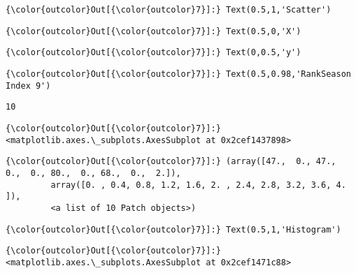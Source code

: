 \documentclass[11pt]{article}
\begin{document}
\begin{Verbatim}[commandchars=\\\{\}]
{\color{outcolor}Out[{\color{outcolor}7}]:} Text(0.5,1,'Scatter')
\end{Verbatim}
            
\begin{Verbatim}[commandchars=\\\{\}]
{\color{outcolor}Out[{\color{outcolor}7}]:} Text(0.5,0,'X')
\end{Verbatim}
            
\begin{Verbatim}[commandchars=\\\{\}]
{\color{outcolor}Out[{\color{outcolor}7}]:} Text(0,0.5,'y')
\end{Verbatim}
            
\begin{Verbatim}[commandchars=\\\{\}]
{\color{outcolor}Out[{\color{outcolor}7}]:} Text(0.5,0.98,'RankSeason Index 9')
\end{Verbatim}
            
    \begin{Verbatim}[commandchars=\\\{\}]
10

    \end{Verbatim}

\begin{Verbatim}[commandchars=\\\{\}]
{\color{outcolor}Out[{\color{outcolor}7}]:} <matplotlib.axes.\_subplots.AxesSubplot at 0x2cef1437898>
\end{Verbatim}
            
\begin{Verbatim}[commandchars=\\\{\}]
{\color{outcolor}Out[{\color{outcolor}7}]:} (array([47.,  0., 47.,  0.,  0., 80.,  0., 68.,  0.,  2.]),
         array([0. , 0.4, 0.8, 1.2, 1.6, 2. , 2.4, 2.8, 3.2, 3.6, 4. ]),
         <a list of 10 Patch objects>)
\end{Verbatim}
            
\begin{Verbatim}[commandchars=\\\{\}]
{\color{outcolor}Out[{\color{outcolor}7}]:} Text(0.5,1,'Histogram')
\end{Verbatim}
            
\begin{Verbatim}[commandchars=\\\{\}]
{\color{outcolor}Out[{\color{outcolor}7}]:} <matplotlib.axes.\_subplots.AxesSubplot at 0x2cef1471c88>
\end{Verbatim}
            
\end{document}
